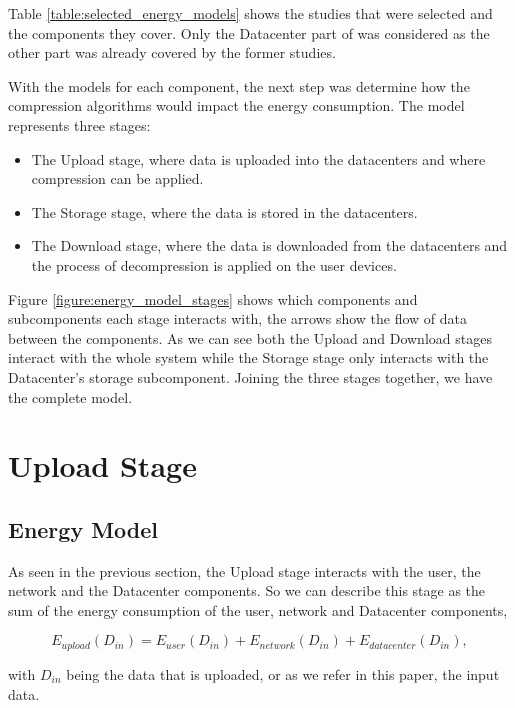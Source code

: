     Table \ref{table:selected_energy_models} shows the studies that were selected and the components they cover. Only the Datacenter part of \citet{Taal2014} was considered as the other part was already covered by the former studies. 
    
    With the models for each component, the next step was determine how the compression algorithms would impact the energy consumption.
    The model represents three stages:
    \begin{itemize}
        \item The Upload stage, where data is uploaded into the datacenters and where compression can be applied.
        \item The Storage stage, where the data is stored in the datacenters.
        \item The Download stage, where the data is downloaded from the datacenters and the process of decompression is applied on the user devices.
    \end{itemize} 

    Figure \ref{figure:energy_model_stages}
    shows which components and subcomponents each stage interacts with, the arrows show the flow of data between the components. 
    As we can see both the Upload and Download stages interact with the whole system while the Storage stage only interacts with the Datacenter's storage subcomponent. Joining the three stages together, we have the complete  model.
    
\section{Upload Stage}

\subsection{Energy Model}

    As seen in the previous section, the Upload stage interacts with the user, the network and the Datacenter components. So we can describe this stage as the sum of the energy consumption of the user, network and Datacenter components,

    \begin{equation}
        \label{formula:upload_stage}
        E_{upload}(D_{in}) = E_{user}(D_{in}) + E_{network}(D_{in}) + E_{datacenter}(D_{in}),
    \end{equation}

    \noindent with $D_{in}$ being the data that is uploaded, or as we refer in this paper, the input data. 

